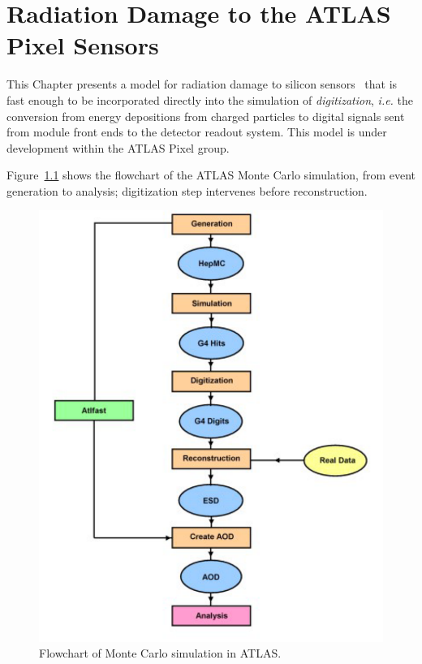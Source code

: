 \chapter{Radiation Damage to the ATLAS Pixel Sensors}
\label{chap:digi}

This Chapter presents a model for radiation damage to silicon sensors~\cite{DigitizerPSD11} that is fast enough to be incorporated directly into the simulation of \textit{digitization}, {\it i.e.} the conversion from energy depositions from charged particles to digital signals sent from module front ends to the detector readout system.  This model is under development within the ATLAS Pixel 
group.


Figure~\ref{fig:atlassim} shows the flowchart of the ATLAS Monte Carlo simulation, from 
event generation to analysis; digitization step intervenes before reconstruction.


\begin{figure}[!htpb]
\centering
\includegraphics[height=0.45\textheight]{atlassim.pdf}
\caption{\label{fig:atlassim}Flowchart of Monte Carlo simulation in ATLAS.}
\end{figure}

